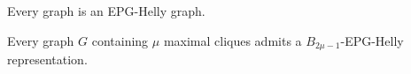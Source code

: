 \documentclass[runningheads]{llncs}
\begin{document}
 
 \begin{lemma}\label{lem:todoGrafoEpgHelly}
 Every graph is an EPG-Helly graph.
 \end{lemma}
  
  
  
 
 
%   
 
 
 \begin{corollary}\label{cor:maxCliques}
 Every graph $G$ containing $\mu$ maximal cliques admits a $B_{2\mu -1}$-EPG-Helly representation. %
 \end{corollary}
 
\end{document}
